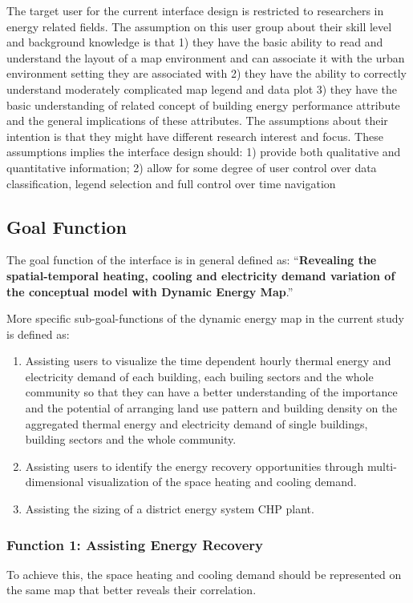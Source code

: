 The target user for the current interface design is restricted to
researchers in energy related fields. The assumption on this user
group about their skill level and background knowledge is that 1) they
have the basic ability to read and understand the layout of a map
environment and can associate it with the urban environment setting
they are associated with 2) they have the ability to correctly
understand moderately complicated map legend and data plot 3) they
have the basic understanding of related concept of building energy
performance attribute and the general implications of these
attributes. The assumptions about their intention is that they might
have different research interest and focus. These assumptions implies
the interface design should: 1) provide both qualitative and
quantitative information; 2) allow for some degree of user control
over data classification, legend selection and full control over time
navigation

\subsection{Goal Function}
The goal function of the interface is in general defined as:
``\textbf{Revealing the spatial-temporal heating, cooling and
  electricity demand variation of the conceptual model with Dynamic
  Energy Map}.''

More specific sub-goal-functions of the dynamic energy map in the
current study is defined as:
\begin{enumerate}[1)]
\item Assisting users to visualize the time dependent hourly thermal
  energy and electricity demand of each building, each builing sectors
  and the whole community so that they can have a better understanding
  of the importance and the potential of arranging land use pattern
  and building density on the aggregated thermal energy and
  electricity demand of single buildings, building sectors and the
  whole community.
\item Assisting users to identify the energy recovery opportunities
  through multi-dimensional visualization of the space heating and
  cooling demand.
\item Assisting the sizing of a district energy system CHP plant.
\end{enumerate}

\subsubsection{Function 1: Assisting Energy Recovery}
To achieve this, the space heating and cooling demand should be
represented on the same map that better reveals their correlation.

